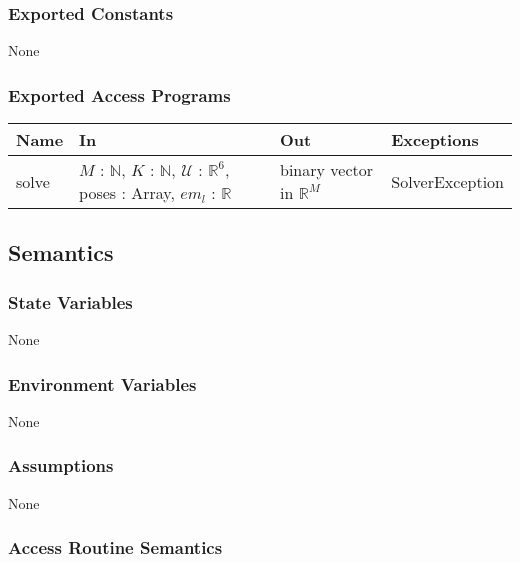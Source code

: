 \documentclass[12pt, titlepage]{article}
\begin{document}
\subsubsection{Exported Constants}
None

\subsubsection{Exported Access Programs}

\begin{center}
  \begin{tabular}{p{3cm} p{4cm} p{4cm} p{3cm}}
  \hline
  \textbf{Name} & \textbf{In} & \textbf{Out} & \textbf{Exceptions} \\
  \hline
  solve & $M$ : $\mathbb{N}$, $K$ : $\mathbb{N}$, $\mathcal{U}$ : $\mathbb{R}^{6}$, poses : Array, $em_l$ : $\mathbb{R}$ & binary vector in $\mathbb{R}^M$ & SolverException \\
  \hline
  \end{tabular}
  \end{center}

\subsection{Semantics}

\subsubsection{State Variables}
None

\subsubsection{Environment Variables}
None 

\subsubsection{Assumptions}
None

\subsubsection{Access Routine Semantics}
\end{document}
